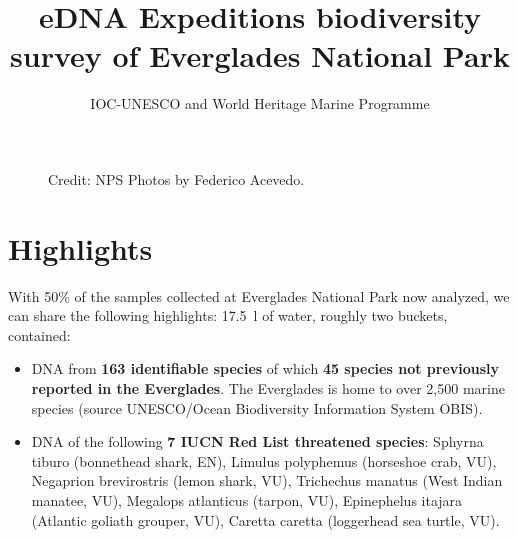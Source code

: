 \documentclass[10pt]{article}
\date{}
\title{eDNA Expeditions biodiversity survey of Everglades National Park}
\begin{document}
\author{IOC-UNESCO and World Heritage Marine Programme}

\maketitle

\begin{figure}[h]
 	\centering
 	\caption*{Credit: NPS Photos by Federico Acevedo.}
\end{figure}

\section*{Highlights}

With 50\% of the samples collected at Everglades National Park now analyzed, we can share the following highlights: \SI{17.5}{\litre} of water, roughly two buckets, contained:

\begin{itemize}
\item DNA from \textbf{163 identifiable species} of which \textbf{45 species not previously reported in the Everglades}. The Everglades is home to over 2,500 marine species (source UNESCO/Ocean Biodiversity Information System OBIS).
\item DNA of the following \textbf{7 IUCN Red List threatened species}: Sphyrna tiburo (bonnethead shark, EN), Limulus polyphemus (horseshoe crab, VU), Negaprion brevirostris (lemon shark, VU), Trichechus manatus (West Indian manatee, VU), Megalops atlanticus (tarpon, VU), Epinephelus itajara (Atlantic goliath grouper, VU), Caretta caretta (loggerhead sea turtle, VU).
\end{itemize}
\end{document}
